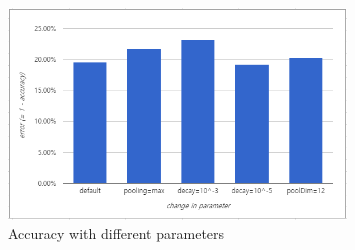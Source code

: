 \documentclass[a4paper,10pt]{article}
\begin{document}
\begin{figure}[h]
\caption{Accuracy with different parameters}
\label{fig:accuracy}
\centering
\includegraphics[width=0.8\textwidth]{accuracy}
\end{figure}
\end{document}
